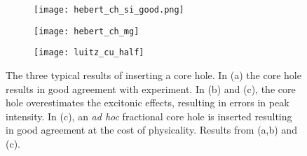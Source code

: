\begin{figure}
	\begin{subfigure}{0.45\textwidth}
		\texttt{[image: hebert\_ch\_si\_good.png]} 
		\caption{}
		\label{hebert-ch-good}
	\end{subfigure}
    \hspace{-0.01cm}
	\begin{subfigure}{0.45\textwidth}
		\texttt{[image: hebert\_ch\_mg]} 
		\caption{}
		\label{hebert-ch-bad}
	\end{subfigure}
	\vspace{1cm}
	\begin{subfigure}{0.45\textwidth}
		\texttt{[image: luitz\_cu\_half]} 
		\caption{}
		\label{luitz_half}
	\end{subfigure}
	\centering
	\caption{The three typical results of inserting a core hole. In (a) the core hole results in good agreement with experiment.  In (b) and (c), the core hole overestimates the excitonic effects, resulting in errors in peak intensity.  In (c), an \textit{ad hoc} fractional core hole is inserted resulting in good agreement at the cost of physicality. Results from \cite{hebert_improvement_2003} (a,b) and \cite{luitz_partial_2001} (c).}
	\label{core-hole-types}
	
\end{figure}

\newpage




